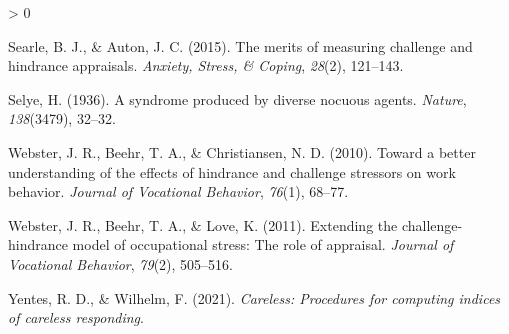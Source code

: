 \documentclass[
  english,
  man]{apa6}
\newlength{\cslhangindent}
\newenvironment{CSLReferences}[2] %
 {%
  \setlength{\parindent}{0pt}
  \ifodd #1 \everypar{\setlength{\hangindent}{\cslhangindent}}\ignorespaces\fi
  \ifnum #2 > 0
  \setlength{\parskip}{#2\baselineskip}
  \fi
 }%
 {}
\begin{document}
\begin{CSLReferences}{1}{0}
\leavevmode\hypertarget{ref-searle2015merits}{}%
Searle, B. J., \& Auton, J. C. (2015). The merits of measuring challenge and hindrance appraisals. \emph{Anxiety, Stress, \& Coping}, \emph{28}(2), 121--143.

\leavevmode\hypertarget{ref-selye1936syndrome}{}%
Selye, H. (1936). A syndrome produced by diverse nocuous agents. \emph{Nature}, \emph{138}(3479), 32--32.

\leavevmode\hypertarget{ref-webster2010toward}{}%
Webster, J. R., Beehr, T. A., \& Christiansen, N. D. (2010). Toward a better understanding of the effects of hindrance and challenge stressors on work behavior. \emph{Journal of Vocational Behavior}, \emph{76}(1), 68--77.

\leavevmode\hypertarget{ref-webster2011extending}{}%
Webster, J. R., Beehr, T. A., \& Love, K. (2011). Extending the challenge-hindrance model of occupational stress: The role of appraisal. \emph{Journal of Vocational Behavior}, \emph{79}(2), 505--516.

\leavevmode\hypertarget{ref-R-careless}{}%
Yentes, R. D., \& Wilhelm, F. (2021). \emph{Careless: Procedures for computing indices of careless responding}.

\end{CSLReferences}

\endgroup
\end{document}
